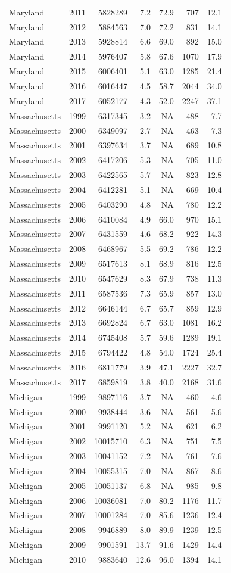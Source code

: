 \documentclass[
]{article}
\begin{document}
\begin{longtable}[]{@{}lrrrrrr@{}}
Maryland & 2011 & 5828289 & 7.2 & 72.9 & 707 & 12.1\tabularnewline
Maryland & 2012 & 5884563 & 7.0 & 72.2 & 831 & 14.1\tabularnewline
Maryland & 2013 & 5928814 & 6.6 & 69.0 & 892 & 15.0\tabularnewline
Maryland & 2014 & 5976407 & 5.8 & 67.6 & 1070 & 17.9\tabularnewline
Maryland & 2015 & 6006401 & 5.1 & 63.0 & 1285 & 21.4\tabularnewline
Maryland & 2016 & 6016447 & 4.5 & 58.7 & 2044 & 34.0\tabularnewline
Maryland & 2017 & 6052177 & 4.3 & 52.0 & 2247 & 37.1\tabularnewline
Massachusetts & 1999 & 6317345 & 3.2 & NA & 488 & 7.7\tabularnewline
Massachusetts & 2000 & 6349097 & 2.7 & NA & 463 & 7.3\tabularnewline
Massachusetts & 2001 & 6397634 & 3.7 & NA & 689 & 10.8\tabularnewline
Massachusetts & 2002 & 6417206 & 5.3 & NA & 705 & 11.0\tabularnewline
Massachusetts & 2003 & 6422565 & 5.7 & NA & 823 & 12.8\tabularnewline
Massachusetts & 2004 & 6412281 & 5.1 & NA & 669 & 10.4\tabularnewline
Massachusetts & 2005 & 6403290 & 4.8 & NA & 780 & 12.2\tabularnewline
Massachusetts & 2006 & 6410084 & 4.9 & 66.0 & 970 & 15.1\tabularnewline
Massachusetts & 2007 & 6431559 & 4.6 & 68.2 & 922 & 14.3\tabularnewline
Massachusetts & 2008 & 6468967 & 5.5 & 69.2 & 786 & 12.2\tabularnewline
Massachusetts & 2009 & 6517613 & 8.1 & 68.9 & 816 & 12.5\tabularnewline
Massachusetts & 2010 & 6547629 & 8.3 & 67.9 & 738 & 11.3\tabularnewline
Massachusetts & 2011 & 6587536 & 7.3 & 65.9 & 857 & 13.0\tabularnewline
Massachusetts & 2012 & 6646144 & 6.7 & 65.7 & 859 & 12.9\tabularnewline
Massachusetts & 2013 & 6692824 & 6.7 & 63.0 & 1081 & 16.2\tabularnewline
Massachusetts & 2014 & 6745408 & 5.7 & 59.6 & 1289 & 19.1\tabularnewline
Massachusetts & 2015 & 6794422 & 4.8 & 54.0 & 1724 & 25.4\tabularnewline
Massachusetts & 2016 & 6811779 & 3.9 & 47.1 & 2227 & 32.7\tabularnewline
Massachusetts & 2017 & 6859819 & 3.8 & 40.0 & 2168 & 31.6\tabularnewline
Michigan & 1999 & 9897116 & 3.7 & NA & 460 & 4.6\tabularnewline
Michigan & 2000 & 9938444 & 3.6 & NA & 561 & 5.6\tabularnewline
Michigan & 2001 & 9991120 & 5.2 & NA & 621 & 6.2\tabularnewline
Michigan & 2002 & 10015710 & 6.3 & NA & 751 & 7.5\tabularnewline
Michigan & 2003 & 10041152 & 7.2 & NA & 761 & 7.6\tabularnewline
Michigan & 2004 & 10055315 & 7.0 & NA & 867 & 8.6\tabularnewline
Michigan & 2005 & 10051137 & 6.8 & NA & 985 & 9.8\tabularnewline
Michigan & 2006 & 10036081 & 7.0 & 80.2 & 1176 & 11.7\tabularnewline
Michigan & 2007 & 10001284 & 7.0 & 85.6 & 1236 & 12.4\tabularnewline
Michigan & 2008 & 9946889 & 8.0 & 89.9 & 1239 & 12.5\tabularnewline
Michigan & 2009 & 9901591 & 13.7 & 91.6 & 1429 & 14.4\tabularnewline
Michigan & 2010 & 9883640 & 12.6 & 96.0 & 1394 & 14.1\tabularnewline

\end{longtable}
\end{document}
